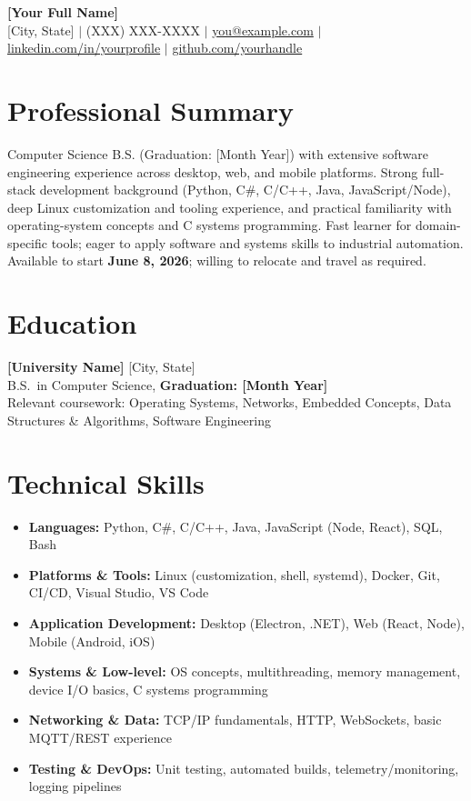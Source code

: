 \documentclass[11pt]{article}
\begin{document}
\begin{center}
  {\LARGE \textbf{[Your Full Name]}}\\[4pt]
  [City, State] \; $|$ \; (XXX) XXX-XXXX \; $|$ \; \href{mailto:you@example.com}{you@example.com} \; $|$ \; \href{https://linkedin.com/in/yourprofile}{linkedin.com/in/yourprofile} \; $|$ \; \href{https://github.com/yourhandle}{github.com/yourhandle}
\end{center}

\section*{Professional Summary}
Computer Science B.S. (Graduation: [Month Year]) with extensive software engineering experience across desktop, web, and mobile platforms. Strong full-stack development background (Python, C\#, C/C++, Java, JavaScript/Node), deep Linux customization and tooling experience, and practical familiarity with operating-system concepts and C systems programming. Fast learner for domain-specific tools; eager to apply software and systems skills to industrial automation. Available to start \textbf{June 8, 2026}; willing to relocate and travel as required.

\section*{Education}
\textbf{[University Name]} \hfill [City, State] \\
B.S.\ in Computer Science, \textbf{Graduation: [Month Year]} \\
Relevant coursework: Operating Systems, Networks, Embedded Concepts, Data Structures \& Algorithms, Software Engineering

\section*{Technical Skills}
\begin{itemize}
  \item \textbf{Languages:} Python, C\#, C/C++, Java, JavaScript (Node, React), SQL, Bash
  \item \textbf{Platforms \& Tools:} Linux (customization, shell, systemd), Docker, Git, CI/CD, Visual Studio, VS Code
  \item \textbf{Application Development:} Desktop (Electron, .NET), Web (React, Node), Mobile (Android, iOS)
  \item \textbf{Systems \& Low-level:} OS concepts, multithreading, memory management, device I/O basics, C systems programming
  \item \textbf{Networking \& Data:} TCP/IP fundamentals, HTTP, WebSockets, basic MQTT/REST experience
  \item \textbf{Testing \& DevOps:} Unit testing, automated builds, telemetry/monitoring, logging pipelines
\end{itemize}
\end{document}
